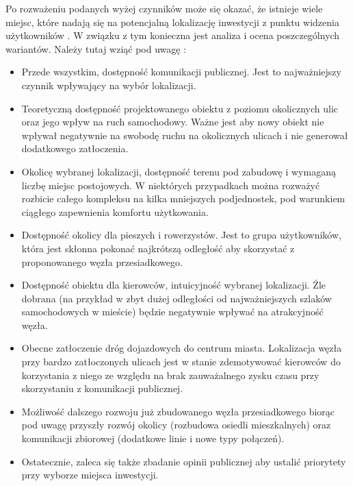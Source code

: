 \documentclass[twoside,12pt]{article}
\begin{document}
	Po rozważeniu podanych wyżej czynników może się okazać, że istnieje wiele miejsc, które nadają się na potencjalną lokalizację inwestycji z punktu widzenia użytkowników \pnr{}. W związku z tym konieczna jest analiza i ocena poszczególnych wariantów. Należy tutaj wziąć pod uwagę \cite{guide} \cite{metodyka}:
	\begin{itemize}\setlength\itemsep{0em}
		\item Przede wszystkim, dostępność komunikacji publicznej. Jest to najważniejszy czynnik wpływający na wybór lokalizacji. 
		\item Teoretyczną dostępność projektowanego obiektu z poziomu okolicznych ulic oraz jego wpływ na ruch samochodowy. Ważne jest aby nowy obiekt nie wpływał negatywnie na swobodę ruchu na okolicznych ulicach i nie generował dodatkowego zatłoczenia.
		\item Okolicę wybranej lokalizacji, dostępność terenu pod zabudowę i wymaganą liczbę miejsc postojowych. W niektórych przypadkach można rozważyć rozbicie całego kompleksu na kilka mniejszych podjednostek, pod warunkiem ciągłego zapewnienia komfortu użytkowania.
		\item Dostępność okolicy dla pieszych i rowerzystów. Jest to grupa użytkowników, która jest skłonna pokonać najkrótszą odległość aby skorzystać z proponowanego węzła przesiadkowego. 
		\item Dostępność obiektu dla kierowców, intuicyjność wybranej lokalizacji. Źle dobrana (na przykład w zbyt dużej odległości od najważniejszych szlaków samochodowych w mieście) będzie negatywnie wpływać na atrakcyjność węzła.
		\item Obecne zatłoczenie dróg dojazdowych do centrum miasta. Lokalizacja węzła przy bardzo zatłoczonych ulicach jest w stanie zdemotywować kierowców do korzystania z niego ze względu na brak zauważalnego zysku czasu przy skorzystaniu z komunikacji publicznej. 
		\item Możliwość dalszego rozwoju już zbudowanego węzła przesiadkowego biorąc pod uwagę przyszły rozwój okolicy (rozbudowa osiedli mieszkalnych) oraz komunikacji zbiorowej (dodatkowe linie i nowe typy połączeń).
		\item Ostatecznie, zaleca się także zbadanie opinii publicznej aby ustalić priorytety przy wyborze miejsca inwestycji.		
	\end{itemize}
	
\end{document}
